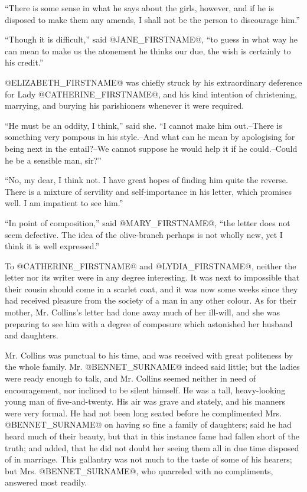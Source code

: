 ``There is some sense in what he says about the girls, however, and if
he is disposed to make them any amends, I shall not be the person to
discourage him.''

``Though it is difficult,'' said @JANE_FIRSTNAME@, ``to guess in what way he can mean
to make us the atonement he thinks our due, the wish is certainly to his
credit.''

@ELIZABETH_FIRSTNAME@ was chiefly struck by his extraordinary deference for Lady
@CATHERINE_FIRSTNAME@, and his kind intention of christening, marrying, and burying
his parishioners whenever it were required.

``He must be an oddity, I think,'' said she. ``I cannot make him
out.--There is something very pompous in his style.--And what can he
mean by apologising for being next in the entail?--We cannot suppose he
would help it if he could.--Could he be a sensible man, sir?''

``No, my dear, I think not. I have great hopes of finding him quite the
reverse. There is a mixture of servility and self-importance in his
letter, which promises well. I am impatient to see him.''

``In point of composition,'' said @MARY_FIRSTNAME@, ``the letter does not seem
defective. The idea of the olive-branch perhaps is not wholly new, yet I
think it is well expressed.''

To @CATHERINE_FIRSTNAME@ and @LYDIA_FIRSTNAME@, neither the letter nor its writer were in any
degree interesting. It was next to impossible that their cousin should
come in a scarlet coat, and it was now some weeks since they had
received pleasure from the society of a man in any other colour. As for
their mother, Mr. Collins's letter had done away much of her ill-will,
and she was preparing to see him with a degree of composure which
astonished her husband and daughters.

Mr. Collins was punctual to his time, and was received with great
politeness by the whole family. Mr. @BENNET_SURNAME@ indeed said little; but the
ladies were ready enough to talk, and Mr. Collins seemed neither in
need of encouragement, nor inclined to be silent himself. He was a
tall, heavy-looking young man of five-and-twenty. His air was grave and
stately, and his manners were very formal. He had not been long seated
before he complimented Mrs. @BENNET_SURNAME@ on having so fine a family of
daughters; said he had heard much of their beauty, but that in this
instance fame had fallen short of the truth; and added, that he did
not doubt her seeing them all in due time disposed of in marriage. This
gallantry was not much to the taste of some of his hearers; but Mrs.
@BENNET_SURNAME@, who quarreled with no compliments, answered most readily.

